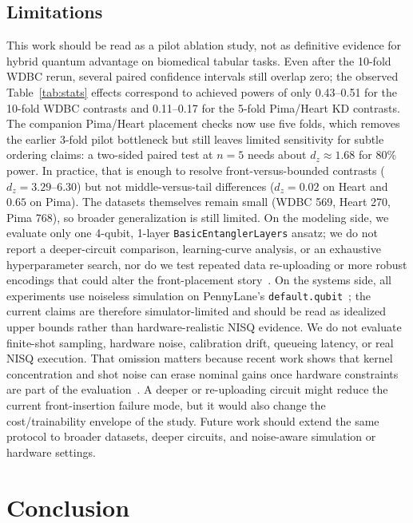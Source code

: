 \documentclass[11pt,a4paper]{article}
\begin{document}
\subsection{Limitations}
This work should be read as a pilot ablation study, not as definitive evidence for hybrid quantum
advantage on biomedical tabular tasks. Even after the 10-fold WDBC rerun, several paired confidence
intervals still overlap zero; the observed Table~\ref{tab:stats} effects correspond to achieved
powers of only 0.43--0.51 for the 10-fold WDBC contrasts and 0.11--0.17 for the 5-fold Pima/Heart
KD contrasts. The companion Pima/Heart placement checks now use five folds, which removes the
earlier 3-fold pilot bottleneck but still leaves limited sensitivity for subtle ordering claims: a
two-sided paired test at $n=5$ needs about $d_z \approx 1.68$ for 80\% power. In practice, that is
enough to resolve front-versus-bounded contrasts ($d_z=3.29$--$6.30$) but not middle-versus-tail
differences ($d_z=0.02$ on Heart and $0.65$ on Pima). The datasets themselves remain small (WDBC
569, Heart 270, Pima 768), so broader generalization is still limited. On the modeling side, we evaluate only one
4-qubit, 1-layer
\texttt{BasicEntanglerLayers} ansatz; we do not report a deeper-circuit comparison, learning-curve
analysis, or an exhaustive hyperparameter search, nor do we test repeated data re-uploading or more
robust encodings that could alter the front-placement
story~\cite{perezsalinas2020reuploading,larose2020robust,schuld2021encoding}. On the systems side,
all experiments use noiseless simulation on PennyLane's \texttt{default.qubit}~\cite{pennylane}; the
current claims are therefore simulator-limited and should be read as idealized upper bounds rather
than hardware-realistic NISQ evidence. We do not evaluate finite-shot sampling, hardware noise,
calibration drift, queueing latency, or real NISQ execution. That omission matters because recent
work shows that kernel concentration and shot noise can erase nominal gains once hardware
constraints are part of the evaluation~\cite{peters2021highdim,thanasilp2024kernel}. A deeper or
re-uploading circuit might reduce the current front-insertion failure mode, but it would also change
the cost/trainability envelope of the study.
Future work should extend the same protocol to broader datasets, deeper circuits, and noise-aware
simulation or hardware settings.

\section{Conclusion}
\label{sec:conc}
\end{document}
